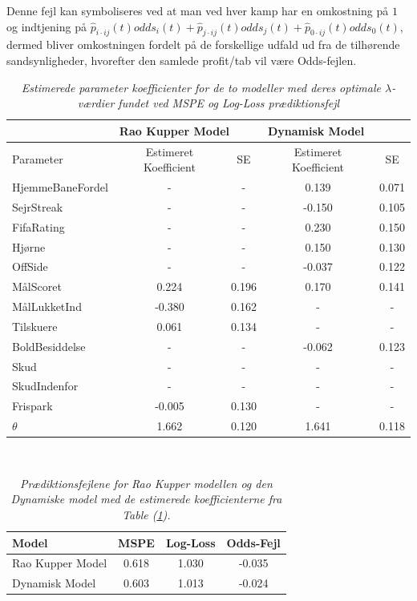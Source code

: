 \documentclass[11pt,a4paper]{article}
\begin{document}
Denne fejl kan symboliseres ved at man ved hver kamp har en omkostning på $1$ og indtjening på $\hat{p}_{i\cdot ij}(t)odds_i(t)+\hat{p}_{j\cdot ij}(t)odds_j(t)+\hat{p}_{0\cdot ij}(t)odds_0(t)$, dermed bliver omkostningen fordelt på de forskellige udfald ud fra de tilhørende sandsynligheder, hvorefter den samlede profit/tab vil være Odds-fejlen. 
\begin{table}[ht!]
\centering
\begin{adjustbox}{max width=\textwidth}
\begin{tabular}{|l|cc|cc|}
\hline
\multicolumn{1}{|l|}{} & \multicolumn{2}{l|}{Rao Kupper Model} & \multicolumn{2}{l|}{Dynamisk Model} \\\hline 
Parameter & Estimeret Koefficient & SE & Estimeret Koefficient & SE\\
 \hline
HjemmeBaneFordel & - & - & 0.139 & 0.071\\
SejrStreak & - & - & -0.150 & 0.105 \\
FifaRating & - & - & 0.230 & 0.150 \\
Hjørne & - & - & 0.150 & 0.130 \\
OffSide  & - & - & -0.037 & 0.122 \\
MålScoret  & 0.224 & 0.196 & 0.170 & 0.141 \\
MålLukketInd  & -0.380 & 0.162 & - & -\\
Tilskuere & 0.061 & 0.134 & - & -\\
BoldBesiddelse & - & - & -0.062 & 0.123  \\
Skud & - & - & - & -\\
SkudIndenfor & - & - & - & -\\
Frispark & -0.005 & 0.130 & - & -\\
$\theta$ & 1.662 & 0.120 & 1.641 & 0.118\\
   \hline   
\end{tabular} 
\end{adjustbox}
\caption{\label{tab:EstKoefOptLambda}\textit{Estimerede parameter koefficienter for de to modeller med deres optimale $\lambda$-værdier fundet ved MSPE og Log-Loss prædiktionsfejl}}
\end{table}\\
\begin{table}[thb!]
\centering
\begin{adjustbox}{max width=\textwidth}
\begin{tabular}{|l|ccc|}
\hline 
Model & MSPE & Log-Loss & Odds-Fejl \\
 \hline
Rao Kupper Model & 0.618 & 1.030 & -0.035\\
Dynamisk Model & 0.603 & 1.013 & -0.024 \\
   \hline   
\end{tabular} 
\end{adjustbox}
\caption{\label{tab:MSPELOGLOSODDSFEJL}\textit{Prædiktionsfejlene for Rao Kupper modellen og den Dynamiske model med de estimerede koefficienterne fra Table (\ref{tab:EstKoefOptLambda}).}}
\end{table}\\
\end{document}
